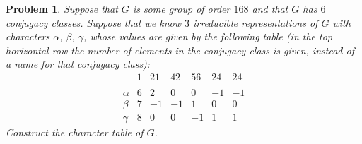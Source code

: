 \documentclass{article}
\newtheorem{problem}{Problem}
\begin{document}
\begin{problem}
Suppose that $G$ is some group of order $168$ and that $G$ has $6$ conjugacy classes. Suppose that we know $3$ irreducible representations of $G$ with characters $\alpha$, $\beta$, $\gamma$, whose values are given by the following table (in the top horizontal row the number of elements in the conjugacy class is given, instead of a name for that conjugacy class):
\[
\begin{array}{rrrrrrr}
& 1 & 21 & 42 & 56 & 24 & 24\\
&&&&&&\\
\alpha & 6 & 2 & 0 & 0 & -1 & -1\\
\beta & 7 & -1 & -1 & 1 & 0 & 0\\
\gamma & 8 & 0 & 0 & -1 & 1 & 1
\end{array}
\]
Construct the character table of $G$.
\end{problem}
\end{document}
